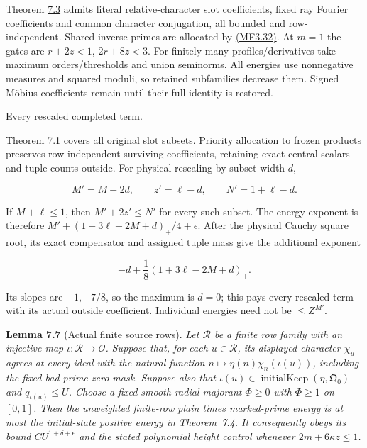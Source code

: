Theorem \protect\hyperlink{mf:inverse}{7.3} admits literal relative-character slot coefficients, fixed ray Fourier coefficients and common character conjugation, all bounded and row-independent. Shared inverse primes are allocated by \protect\hyperlink{mf:eq:B3.32}{(MF3.32)}. At \(m=1\) the gates are \(r+2z<1\), \(2r+8z<3\). For finitely many profiles/derivatives take maximum orders/thresholds and union seminorms. All energies use nonnegative measures and squared moduli, so retained subfamilies decrease them. Signed Möbius coefficients remain until their full identity is restored.

\hypertarget{every-rescaled-completed-term.}{}

\label{every-rescaled-completed-term.}

Every rescaled completed term.

Theorem \protect\hyperlink{mf:marked-energy}{7.1} covers all original slot subsets. Priority allocation to frozen products preserves row-independent surviving coefficients, retaining exact central scalars and tuple counts outside. For physical rescaling by subset width \(d\),

\[
M'=M-2d,\qquad z'=\ell-d,\qquad N'=1+\ell-d.
\]

If \(M+\ell\le1\), then \(M'+2z'\le N'\) for every such subset. The energy exponent is therefore \(M'+(1+3\ell-2M+d)_+/4+\epsilon\). After the physical Cauchy square root, its exact compensator and assigned tuple mass give the additional exponent

\[
-d+\frac18(1+3\ell-2M+d)_+.
\]

Its slopes are \(-1,-7/8\), so the maximum is \(d=0\); this pays every rescaled term with its actual outside coefficient. Individual energies need not be \(\le Z^{M'}\).

\textbf{Lemma 7.7} (Actual finite source rows). \emph{\hypertarget{mf:finite-source-field}{}\label{mf:finite-source-field} Let \(\mathcal R\) be a finite row family with an injective map \(\iota:\mathcal R\longrightarrow\mathcal O\). Suppose that, for each \(u\in\mathcal R\), its displayed character \(\chi_u\) agrees at every ideal with the natural function \(n\mapsto\eta(n)\chi_n(\iota(u))\), including the fixed bad-prime zero mask. Suppose also that \(\iota(u)\in\operatorname{initialKeep}(\eta,\mathfrak Q_0)\) and \(q_{\iota(u)}\le U\). Choose a fixed smooth radial majorant \(\Phi\ge0\) with \(\Phi\ge1\) on \([0,1]\). Then the unweighted finite-row plain times marked-prime energy is at most the initial-state positive energy in Theorem~\protect\hyperlink{mf:plain}{7.4}. It consequently obeys its bound \(CU^{1+\delta+\epsilon}\) and the stated polynomial height control whenever \(2m+6\kappa z\le1\).}


